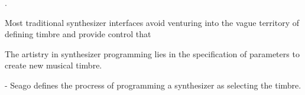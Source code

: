 .


Most traditional synthesizer interfaces avoid venturing into the vague territory of defining timbre and provide control that 















The artistry in synthesizer programming lies in the specification of parameters to create new musical timbre.

- Seago defines the procress of programming a synthesizer as selecting the timbre. \cite{seago2004critical}

